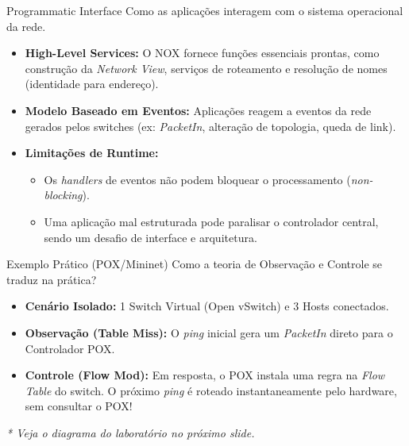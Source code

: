 \documentclass[aspectratio=169,xcolor=dvipsnames]{beamer}
\begin{document}
\begin{frame}{Programmatic Interface}
    Como as aplicações interagem com o sistema operacional da rede.
    
    \vspace{0.5cm}
    
    \begin{itemize}            
        \item \textbf{High-Level Services:} O NOX fornece funções essenciais prontas, como construção da \textit{Network View}, serviços de roteamento e resolução de nomes (identidade para endereço).
        \item \textbf{Modelo Baseado em Eventos:} Aplicações reagem a eventos da rede gerados pelos switches (ex: \textit{PacketIn}, alteração de topologia, queda de link).
        \item \textbf{Limitações de Runtime:}
        \begin{itemize}
            \item Os \textit{handlers} de eventos não podem bloquear o processamento (\textit{non-blocking}).
            \item Uma aplicação mal estruturada pode paralisar o controlador central, sendo um desafio de interface e arquitetura.
        \end{itemize}
    \end{itemize}
\end{frame}

\begin{frame}{Exemplo Prático (POX/Mininet)}
    Como a teoria de Observação e Controle se traduz na prática?
    
    \vspace{0.5cm}
    
    \begin{itemize}            
        \item \textbf{Cenário Isolado:} 1 Switch Virtual (Open vSwitch) e 3 Hosts conectados.
        \item \textbf{Observação (Table Miss):} O \textit{ping} inicial gera um \textit{PacketIn} direto para o Controlador POX.
        \item \textbf{Controle (Flow Mod):} Em resposta, o POX instala uma regra na \textit{Flow Table} do switch. O próximo \textit{ping} é roteado instantaneamente pelo hardware, sem consultar o POX!
    \end{itemize}
    
    \vspace{0.3cm}
    \textit{* Veja o diagrama do laboratório no próximo slide.}
\end{frame}
\end{document}

